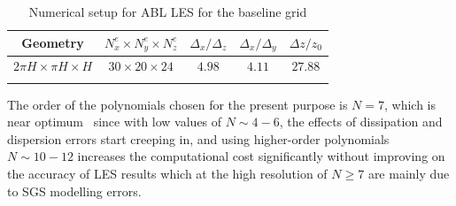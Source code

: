 \begin{table}[ht] 
\centering %
\begin{tabular}{c c c c c} %
\hline\hline    %
Geometry & $N^{e}_x\times N^{e}_y\times N^{e}_z$  & $\Delta_x/\Delta_z$ & $\Delta_x/\Delta_y$ & $\Delta z/z_0$  \\ [0.5 ex] %
\hline  %
$2\pi H \times \pi H \times H$ & $30\times 20\times 24$ & $4.98$ & $4.11$ & $27.88$ \\ [1ex] %
\hline\hline \\ [1 ex]
\end{tabular} 
\caption[Computational Grid in ABL]{Numerical setup for ABL LES for {the baseline grid}} %
\label{table:grid1} %
\end{table} 
  The order of the polynomial{s} chosen for the present purpose is $N = 7$, which is near optimum~\cite{nek5000} since with low values of $N\sim 4-6$, the effects of dissipation and dispersion errors start creeping in, and using higher-order polynomials $N\sim 10-12$ increases the computational cost significantly without improving on the accuracy of LES results which {at the high resolution of $N\geq 7$} are mainly due to SGS modelling errors.
